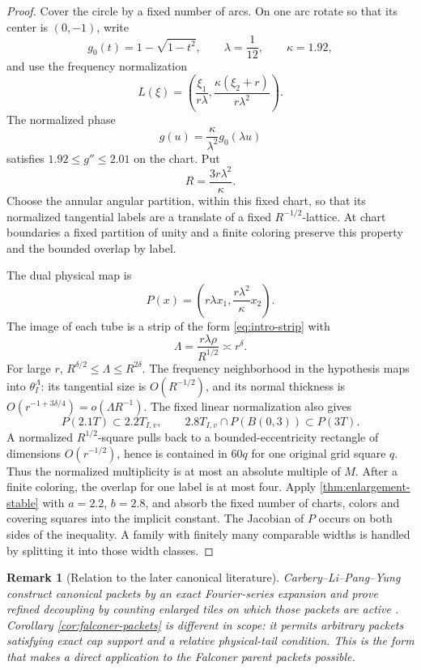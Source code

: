 \documentclass[11pt,letterpaper]{amsart}
\newtheorem{remark}[remark]{Remark}
\begin{document}
\begin{proof}
Cover the circle by a fixed number of arcs.  On one arc rotate so that its
center is \((0,-1)\), write
\[
 g_0(t)=1-\sqrt{1-t^2},
 \qquad \lambda=\frac1{12},\qquad \kappa=1.92,
\]
and use the frequency normalization
\[
 L(\xi)=\left(\frac{\xi_1}{r\lambda},
              \frac{\kappa(\xi_2+r)}{r\lambda^2}\right).
\]
The normalized phase
\[
 g(u)=\frac{\kappa}{\lambda^2}g_0(\lambda u)
\]
satisfies \(1.92\le g''\le2.01\) on the chart.  Put
\[
 R=\frac{3r\lambda^2}{\kappa}.
\]
Choose the annular angular partition, within this fixed chart, so that its
normalized tangential labels are a translate of a fixed
\(R^{-1/2}\)-lattice.  At chart boundaries a fixed partition of unity and a
finite coloring preserve this property and the bounded overlap by label.

The dual physical map is
\[
 P(x)=\left(r\lambda x_1,\frac{r\lambda^2}{\kappa}x_2\right).
\]
The image of each tube is a strip of the form
\eqref{eq:intro-strip} with
\[
 \Lambda=\frac{r\lambda\rho}{R^{1/2}}
 \asymp r^\delta.
\]
For large \(r\),
\(R^{\delta/2}\le\Lambda\le R^{2\delta}\).
The frequency neighborhood in the hypothesis maps into
\(\theta_I^\Lambda\): its tangential size is \(O(R^{-1/2})\), and its
normal thickness is
\(O(r^{-1+3\delta/4})=o(\Lambda R^{-1})\).
The fixed linear normalization also gives
\[
 P(2.1T)\subset2.2T_{I,v},\qquad
 2.8T_{I,v}\cap P(B(0,3))\subset P(3T).
\]
A normalized \(R^{1/2}\)-square pulls back to a bounded-eccentricity
rectangle of dimensions \(O(r^{-1/2})\), hence is contained in \(60q\) for
one original grid square \(q\).  Thus the normalized multiplicity is at most
an absolute multiple of \(M\).  After a finite coloring, the overlap for one
label is at most four.  Apply \cref{thm:enlargement-stable} with
\(a=2.2\), \(b=2.8\), and absorb the fixed number of charts, colors and
covering squares into the implicit constant.  The Jacobian of \(P\) occurs
on both sides of the inequality.  A family with finitely many comparable
widths is handled by splitting it into those width classes.
\end{proof}

\begin{remark}[Relation to the later canonical literature]
Carbery--Li--Pang--Yung construct canonical packets by an exact
Fourier-series expansion and prove refined decoupling by counting enlarged
tiles on which those packets are active \cite{CLPY}.  Corollary
\ref{cor:falconer-packets} is different in scope: it permits arbitrary
packets satisfying exact cap support and a relative physical-tail condition.
This is the form that makes a direct application to the Falconer parent
packets possible.
\end{remark}
\end{document}
